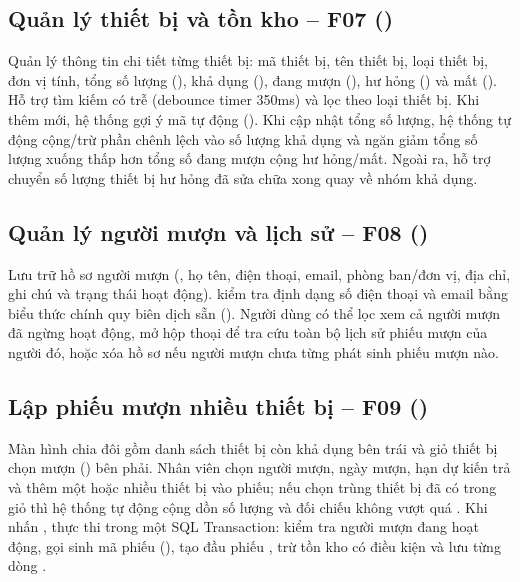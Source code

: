 \subsection{Quản lý thiết bị và tồn kho – F07 (\texorpdfstring{}{DevicePage.cs})}

Quản lý thông tin chi tiết từng thiết bị: mã thiết bị, tên thiết bị, loại thiết bị, đơn vị tính, tổng số lượng (), khả dụng (), đang mượn (), hư hỏng () và mất (). Hỗ trợ tìm kiếm có trễ (debounce timer 350ms) và lọc theo loại thiết bị. Khi thêm mới, hệ thống gợi ý mã tự động (). Khi cập nhật tổng số lượng, hệ thống tự động cộng/trừ phần chênh lệch vào số lượng khả dụng và ngăn giảm tổng số lượng xuống thấp hơn tổng số đang mượn cộng hư hỏng/mất. Ngoài ra,  hỗ trợ chuyển số lượng thiết bị hư hỏng đã sửa chữa xong quay về nhóm khả dụng.


\subsection{Quản lý người mượn và lịch sử – F08 (\texorpdfstring{}{BorrowerPage.cs})}

Lưu trữ hồ sơ người mượn (, họ tên, điện thoại, email, phòng ban/đơn vị, địa chỉ, ghi chú và trạng thái hoạt động).  kiểm tra định dạng số điện thoại và email bằng biểu thức chính quy biên dịch sẵn (). Người dùng có thể lọc xem cả người mượn đã ngừng hoạt động, mở hộp thoại  để tra cứu toàn bộ lịch sử phiếu mượn của người đó, hoặc xóa hồ sơ nếu người mượn chưa từng phát sinh phiếu mượn nào.


\subsection{Lập phiếu mượn nhiều thiết bị – F09 (\texorpdfstring{}{LoanCreatePage.cs})}

Màn hình chia đôi gồm danh sách thiết bị còn khả dụng bên trái và giỏ thiết bị chọn mượn () bên phải. Nhân viên chọn người mượn, ngày mượn, hạn dự kiến trả và thêm một hoặc nhiều thiết bị vào phiếu; nếu chọn trùng thiết bị đã có trong giỏ thì hệ thống tự động cộng dồn số lượng và đối chiếu không vượt quá . Khi nhấn ,  thực thi trong một SQL Transaction: kiểm tra người mượn đang hoạt động, gọi  sinh mã phiếu (), tạo đầu phiếu , trừ tồn kho có điều kiện và lưu từng dòng .



